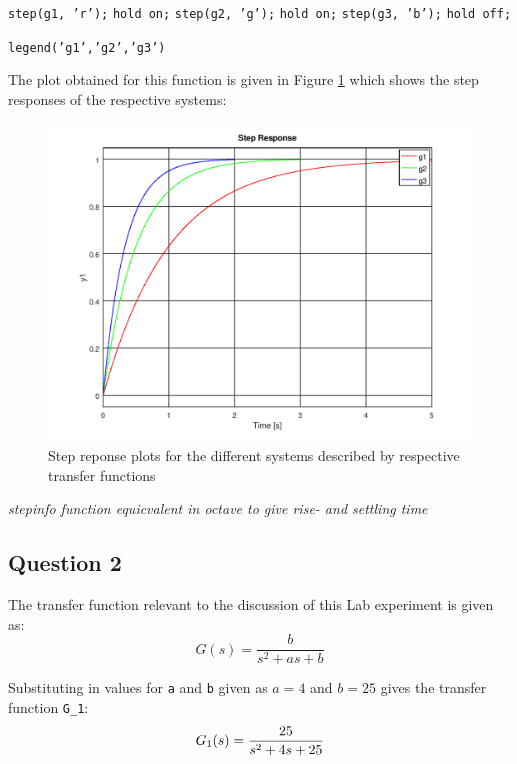 \documentclass[a4paper, 12pt]{article}
\begin{document}
		\texttt{step(g1, 'r');}
		\texttt{hold on;}
		\texttt{step(g2, 'g');}
		\texttt{hold on;}
		\texttt{step(g3, 'b');}
		\texttt{hold off;}

		\texttt{legend('g1','g2','g3')}

		The plot obtained for this function is given in Figure \ref{fig:plot_question_1_lab} which shows the step responses of the respective systems:

		\begin{figure}[H]
			\centering
			\includegraphics[width = 150mm]{img/Question_1_Lab_Plots.png}
			\caption{Step reponse plots for the different systems described by respective transfer functions}
			\label{fig:plot_question_1_lab}
		\end{figure}

		\textit{stepinfo function equicvalent in octave to give rise- and settling time}

	\subsection{Question 2}
	\label{question_2_lab}
		The transfer function relevant to the discussion of this Lab experiment is given as:
		\begin{equation}
				G(s) = \frac{b}{s^2+as+b}	
		\end{equation}

		Substituting in values for \texttt{a} and \texttt{b} given as $a = 4$ and $b = 25$ gives the transfer function \texttt{G\_1}:
		\begin{equation}
			G_1(s) = \frac{25}{s^2+4s+25}\\
		\end{equation}
\end{document}
